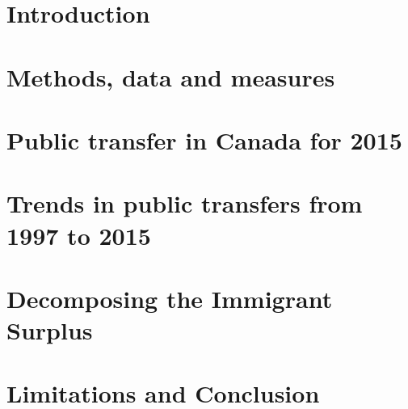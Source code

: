 \section{Introduction}
  
  \label{sec:ntaIntro}

\section{Methods, data and measures }
  

\section{Public transfer in Canada for 2015}\label{sec:life}
  

\section{Trends in public transfers from 1997 to 2015}\label{sec:crude}
  

\section{Decomposing the Immigrant Surplus}\label{sec:decomp}
    


\section{Limitations and Conclusion}
  
  \label{sec:ntaOutro}


